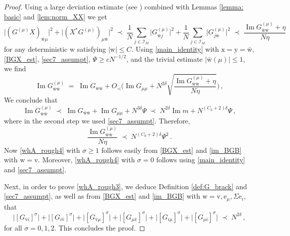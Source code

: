 \documentclass[11pt]{article} %
\numberwithin{equation}{section}
\numberwithin{figure}{section}
\theoremstyle{plain} %
\theoremstyle{definition} %
\newcommand{\f}[1]{\boldsymbol{\mathrm{#1}}} %
\renewcommand{\cal}{\mathcal}
\renewcommand{\leq}{\leqslant}
\renewcommand{\geq}{\geqslant}
\newcommand{\pBB}[1]{\Biggl({#1}\Biggr)}
\newcommand{\abs}[1]{\lvert #1 \rvert}
\newcommand{\absb}[1]{\bigl\lvert #1 \bigr\rvert}
\DeclareMathOperator{\im}{Im}
\begin{document}
\begin{proof}
Using a large deviation estimate (see \cite[Lemma 3.1]{BEKYY}) combined with Lemmas \ref{lemma: basic} and \ref{lem:norm_XX} we get
\begin{equation} \label{BGX_est}
\absb{(G^{(\mu)} X)_{\bar {\f w} \mu}}^2 + \absb{(X^* G^{(\mu)})_{\mu \bar {\f w}}}^2 \;\prec\; \frac{1}{N} \sum_{j \in \cal I_M} \absb{G^{(\mu)}_{\bar {\f w} j}}^2 + \frac{1}{N} \sum_{j \in \cal I_M} \absb{G^{(\mu)}_{j \bar {\f w}}}^2 \;\prec\; \frac{\im G^{(\mu)}_{\bar {\f w} \bar {\f w}} + \eta}{N \eta}
\end{equation}
for any deterministic $\f w$ satisfying $\abs{\f w} \leq C$.
Using \eqref{main_identity} with $\f x = \f y = \bar {\f w}$,
\eqref{BGX_est}, \eqref{sec7_assumpt}, $\Psi \geq cN^{-1/2}$, and the trivial estimate $\abs{\bar {\f w}(\mu)} \leq 1$, we find
\begin{equation*}
\im G^{(\mu)}_{\bar {\f w} \bar {\f w}} \;=\; \im G_{\bar {\f w} \bar {\f w}} + O_\prec \pBB{\im G_{\mu \mu} + N^{2 \delta} \sqrt{\frac{\im G^{(\mu)}_{\bar {\f w} \bar {\f w}} + \eta}{N \eta}}}\,,
\end{equation*}
We conclude that
\begin{equation*}
\im G^{(\mu)}_{\bar {\f w} \bar {\f w}} \;\prec\; \im G_{\bar {\f w} \bar {\f w}} + \im G_{\mu \mu} + N^{3 \delta} \Psi \;\prec\; N^{2 \delta} \im m + N^{(C_0 + 2) \delta} \Psi\,,
\end{equation*}
where in the second step we used \eqref{sec7_assumpt}. Therefore,
\begin{equation} \label{im_BGB}
\frac{\im G^{(\mu)}_{\bar {\f w} \bar {\f w}}}{N \eta} \;\prec\; N^{(C_0 + 2) \delta} \Psi^2\,.
\end{equation}
Now \eqref{whA_rough4} with $\sigma \geq 1$ follows easily from \eqref{BGX_est} and \eqref{im_BGB} with $\f w = \f v$. Moreover, \eqref{whA_rough4} with $\sigma = 0$ follows using \eqref{main_identity} and \eqref{sec7_assumpt}.

Next, in order to prove \eqref{whA_rough3}, we deduce Definition \ref{def:G_brack} and \eqref{sec7_assumpt}, as well as from \eqref{BGX_est} and \eqref{im_BGB} with $\f w = \f v, \f e_\mu, \Sigma \f e_i$, that
\begin{equation} \label{G_sigma_bound}
\absb{[G_{\bar {\f v} i}]^\sigma} + \absb{[G_{i \bar {\f v}}]^\sigma} + \absb{[G_{\bar {\f v} \mu}]^\sigma} + \absb{[G_{\mu \bar {\f v}}]^\sigma} + \absb{[G_{i \mu}]^\sigma} + \absb{[G_{\mu i}]^\sigma} \;\prec\; N^{2 \delta}\,,
\end{equation}
for all $\sigma = 0, 1,2$. This concludes the proof.
\end{proof}
\end{document}
